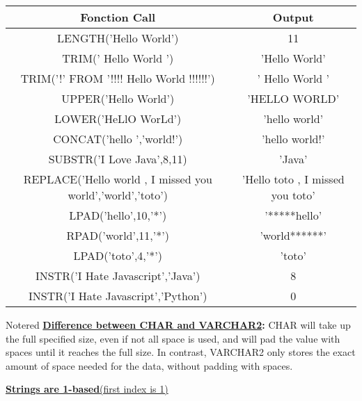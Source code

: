 \vspace{0.25cm}
\begin{center}
    
\renewcommand{\arraystretch}{1.5}
    \begin{tabular}{|c|c|}
        \hline
        Fonction Call & Output\\
        \hline
        LENGTH('Hello World') & 11 \\
        \hline
        TRIM('   Hello  World   ') & 'Hello  World'\\
        \hline
        TRIM('!' FROM '!!!! Hello  World  !!!!!!') & ' Hello  World  ' \\
        \hline
        UPPER('Hello World') &  'HELLO WORLD'\\
        \hline
        LOWER('HeLlO WorLd') & 'hello world'\\
        \hline
        CONCAT('hello ','world!') & 'hello world!'\\
        \hline
        SUBSTR('I Love Java',8,11) & 'Java'\\
        \hline
        REPLACE('Hello world , I missed you world','world','toto') & 'Hello toto , I missed you toto'\\
        \hline
        LPAD('hello',10,'*') & '*****hello'\\
        \hline
        RPAD('world',11,'*') & 'world******' \\
        \hline
        LPAD('toto',4,'*') & 'toto'\\
        \hline
        INSTR('I Hate Javascript','Java') & 8\\
        \hline
        INSTR('I Hate Javascript','Python') & 0\\
        \hline 
   \end{tabular}

\end{center}

\vspace{1cm}
\begin{prettyBox}{Note}{red}
  \textbf{\underline{Difference between CHAR and VARCHAR2}:} CHAR will take up the full specified size, even if not all space is used, and will pad the value with spaces until it reaches the full size. 
In contrast, VARCHAR2 only stores the exact amount of space needed for the data, without padding with spaces.

\vspace{0.25cm}
\underline{\textbf{Strings are 1-based}(first index is 1)}
\end{prettyBox}

